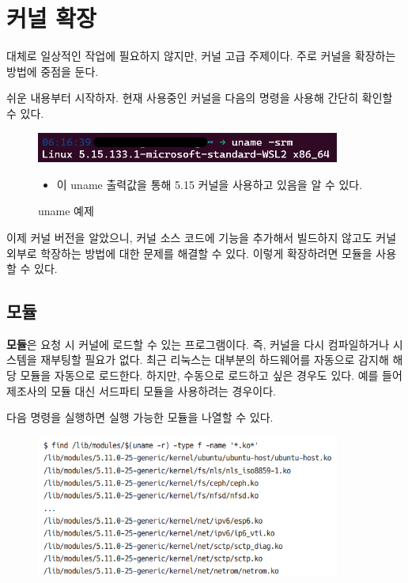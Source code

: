 \section{커널 확장}
\begin{flushleft}
    대체로 일상적인 작업에 필요하지 않지만, 커널 고급 주제이다.
    주로 커널을 확장하는 방법에 중점을 둔다.
\end{flushleft}

\begin{flushleft}
    쉬운 내용부터 시작하자.
    현재 사용중인 커널을 다음의 명령을 사용해 간단히 확인할 수 있다.
\end{flushleft}

\begin{figure}[h]
    \centering
    \includegraphics[width=10cm]{resource/uname-example.png}
    \caption[left]{uname 예제}
    \begin{itemize}
        \item 이 uname 출력값을 통해 5.15 커널을 사용하고 있음을 알 수 있다.
    \end{itemize}
\end{figure}

\begin{flushleft}
    이제 커널 버전을 알았으니, 커널 소스 코드에 기능을 추가해서 빌드하지 않고도
    커널 외부로 학장하는 방법에 대한 문제를 해결할 수 있다.
    이렇게 확장하려면 모듈을 사용할 수 있다.
\end{flushleft}

\subsection*{모듈}
\begin{flushleft}
    \textbf{모듈}은 요청 시 커널에 로드할 수 있는 프로그램이다.
    즉, 커널을 다시 컴파일하거나 시스템을 재부팅할 필요가 없다.
    최근 리눅스는 대부분의 하드웨어를 자동으로 감지해 해당 모듈을 자동으로 로드한다.
    하지만, 수동으로 로드하고 싶은 경우도 있다.
    예를 들어 제조사의 모듈 대신 서드파티 모듈을 사용하려는 경우이다.
\end{flushleft}

\begin{flushleft}
    다음 명령을 실행하면 실행 가능한 모듈을 나열할 수 있다.
\end{flushleft}

\begin{figure}[h]
    \includegraphics[width=10cm]{resource/module-1.png}
\end{figure}
\newpage

